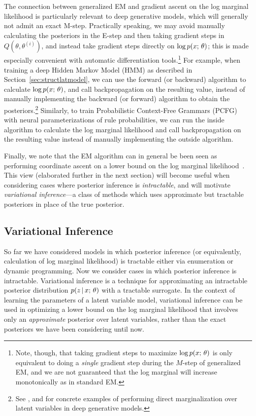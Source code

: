 \documentclass{article}
\begin{document}
The connection between generalized EM and gradient ascent on the log marginal likelihood is particularly relevant to deep generative models, which will generally not admit an exact M-step. Practically speaking, we may avoid manually calculating the posteriors in the E-step and then taking gradient steps in $Q(\theta, \theta^{(i)})$, and instead take gradient steps directly on $\log p(x ; \, \theta)$; this is made especially convenient with automatic differentiation tools.\footnote{Note, though, that taking gradient steps to maximize $\log p(x ; \, \theta)$ is only equivalent to doing a \textit{single} gradient step during the $M$-step of generalized EM, and we are not guaranteed that the log marginal will increase monotonically as in standard EM.} For example, when training a deep
Hidden Markov Model (HMM) as described in Section~\ref{sec:structlatmodel},  we can use the forward (or backward) algorithm to calculate $\log p(x ; \, \theta)$, and call backpropagation
on the resulting value, instead of manually implementing the backward (or forward) algorithm to obtain the posteriors.\footnote{See \citet{kong2016segrnn}, \citet{yu2016online,yu2017noisy} and \citet{wiseman2018learning} for concrete examples of performing direct marginalization over latent variables in deep generative models.} 
Similarly, to train Probabilistic Context-Free Grammars (PCFG) with neural parameterizations of rule probabilities, we can run the inside algorithm to calculate
the log marginal likelihood and call backpropagation on the resulting value instead of manually implementing the outside algorithm.


Finally, we note that the EM algorithm can in general be been seen as performing coordinate ascent
on a lower bound on the log marginal likelihood~\citep{bishop2006prml}. This view (elaborated further in the next section)
will become useful when considering cases where posterior inference is \textit{intractable}, 
and will motivate \emph{variational inference}---a class of methods which uses approximate but tractable posteriors in place of the true posterior.

\subsection{Variational Inference}\label{vi}
So far we have considered models in which posterior inference (or equivalently, calculation of log marginal likelihood) is tractable either via enumeration or dynamic programming. Now we consider cases in which posterior inference is intractable. Variational inference \citep{hinton1993,Jordan1999} is a technique for approximating an intractable posterior distribution
$p(z \,|\, x ; \, \theta)$ with a tractable surrogate. In the context of learning the parameters of a latent variable model, variational inference can be used in optimizing a lower bound on the log marginal likelihood that involves only an \textit{approximate} posterior over latent variables, rather than the exact posteriors we have been considering until now.
\end{document}
